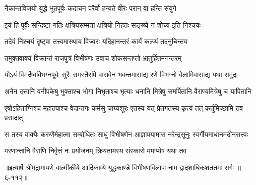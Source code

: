 \twolineshloka
{नैकान्तविजयो युद्धे भूतपूर्वः कदाचन}
{परैर्वा हन्यते वीरः परान् वा हन्ति संयुगे} %

\twolineshloka
{इयं हि पूर्वैः सन्दिष्टा गतिः क्षत्रियसम्मता}
{क्षत्रियो निहतः सङ्ख्ये न शोच्य इति निश्चयः} %

\twolineshloka
{तदेवं निश्चयं दृष्ट्वा तत्त्वमास्थाय विज्वरः}
{यदिहानन्तरं कार्यं कल्प्यं तदनुचिन्तय} %

\twolineshloka
{तमुक्तवाक्यं विक्रान्तं राजपुत्रं विभीषणः}
{उवाच शोकसन्तप्तो भ्रातुर्हितमनन्तरम्} %

\twolineshloka
{योऽयं विमर्देष्वविभग्नपूर्वः सुरैः समस्तैरपि वासवेन}
{भवन्तमासाद्य रणे विभग्नो वेलामिवासाद्य यथा समुद्रः} %

\twolineshloka
{अनेन दत्तानि वनीपकेषु भुक्ताश्च भोगा निभृताश्च भृत्याः}
{धनानि मित्रेषु समर्पितानि वैराण्यमित्रेषु च यापितानि} %

\twolineshloka
{एषोऽहिताग्निश्च महातपाश्च वेदान्तगः कर्मसु चाग्र्यशूरः}
{एतस्य यत् प्रेतगतस्य कृत्यं तत् कर्तुमिच्छामि तव प्रसादात्} %

\twolineshloka
{स तस्य वाक्यैः करुणैर्महात्मा सम्बोधितः साधु विभीषणेन}
{आज्ञापयामास नरेन्द्रसूनुः स्वर्गीयमाधानमदीनसत्त्वः} %

\twolineshloka
{मरणान्तानि वैराणि निर्वृत्तं नः प्रयोजनम्}
{क्रियतामस्य संस्कारो ममाप्येष यथा तव} %


॥इत्यार्षे श्रीमद्रामायणे वाल्मीकीये आदिकाव्ये युद्धकाण्डे विभीषणविलापः नाम द्वादशाधिकशततमः सर्गः ॥६-११२॥
